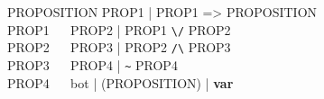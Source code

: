 \documentclass[BA.tex]{subfiles}
\begin{document}
{\ttfamily
\noindent
PROPOSITION   \tra PROP1 | PROP1 => PROPOSITION\\
PROP1 $~~~~~~$\tra PROP2 | PROP1 \verb+\/+ PROP2\\
PROP2 $~~~~~~$\tra PROP3 | PROP2 \verb+/\+ PROP3\\
PROP3 $~~~~~~$\tra PROP4 | \verb+~+ PROP4\\
PROP4 $~~~~~~$\tra bot | (PROPOSITION) | {\bf var}
}
\end{document}

